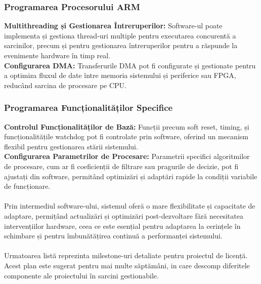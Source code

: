 \documentclass[12pt]{article}
\begin{document}
\subsubsection{Programarea Procesorului ARM}
\textbf{Multithreading și Gestionarea Întreruperilor:} Software-ul poate implementa și gestiona thread-uri multiple pentru executarea concurentă a sarcinilor, precum și pentru gestionarea întreruperilor pentru a răspunde la evenimente hardware în timp real.\\
\textbf{Configurarea DMA:} Transferurile DMA pot fi configurate și gestionate pentru a optimiza fluxul de date între memoria sistemului și periferice sau FPGA, reducând sarcina de procesare pe CPU.\\

\subsubsection{Programarea Funcționalităților Specifice}
\textbf{Controlul Funcționalităților de Bază:} Funcții precum soft reset, timing, și funcționalitățile watchdog pot fi controlate prin software, oferind un mecanism flexibil pentru gestionarea stării sistemului.\\
\textbf{Configurarea Parametrilor de Procesare:} Parametrii specifici algoritmilor de procesare, cum ar fi coeficienții de filtrare sau pragurile de decizie, pot fi ajustați din software, permitând optimizări și adaptări rapide la condiții variabile de funcționare.\\\\
Prin intermediul software-ului, sistemul oferă o mare flexibilitate și capacitate de adaptare, permițând actualizări și optimizări post-dezvoltare fără necesitatea intervențiilor hardware, ceea ce este esențial pentru adaptarea la cerințele în schimbare și pentru îmbunătățirea continuă a performanței sistemului.\\\\
Urmatoarea listă reprezinta milestone-uri detaliate pentru proiectul de licență. Acest plan este sugerat pentru mai multe săptămâni, in care descomp diferitele componente ale proiectului în sarcini gestionabile.
\end{document}
